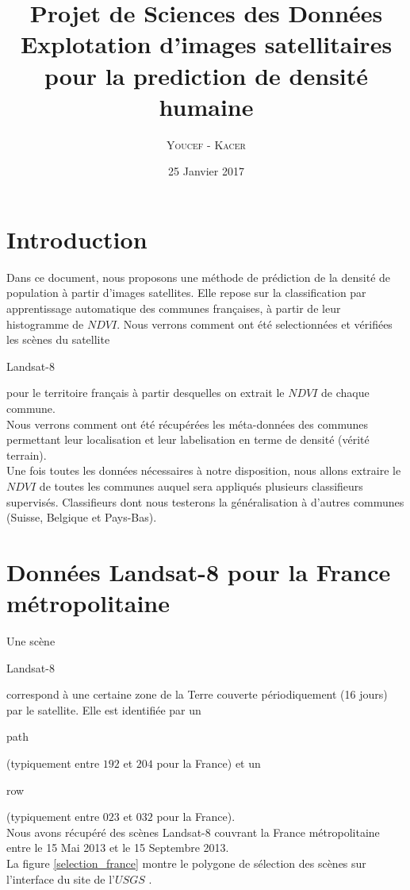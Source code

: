 \documentclass{book}
\title{%
  Projet de Sciences des Données \\
  \large Explotation d'images satellitaires \\pour la prediction de densité humaine\\
    }
\author{\textsc{Youcef} - \textsc{Kacer}}
\date{25 Janvier 2017}
\begin{document}
 
\maketitle

\tableofcontents

\frontmatter
\chapter{Introduction}
Dans ce document, nous proposons une méthode de prédiction de la densité de population à partir d'images satellites.
Elle repose sur la classification par apprentissage automatique des communes françaises, à partir de leur histogramme de $NDVI$. 
Nous verrons comment ont été selectionnées et vérifiées les scènes du satellite \begin{itshape}Landsat-8\end{itshape} pour le territoire français à partir desquelles on extrait le $NDVI$ de chaque commune.\\
Nous verrons comment ont été récupérées les méta-données des communes permettant leur localisation et leur labelisation en terme de densité (vérité terrain).\\
Une fois toutes les données nécessaires à notre disposition, nous allons extraire le $NDVI$ de toutes les communes auquel sera appliqués plusieurs classifieurs supervisés.
Classifieurs dont nous testerons la généralisation à d'autres communes (Suisse, Belgique et Pays-Bas).

\mainmatter
 
\chapter{Données Landsat-8 pour la France métropolitaine}

Une scène \begin{itshape}Landsat-8\end{itshape} correspond à une certaine zone de la Terre couverte périodiquement (16 jours) par le satellite. 
Elle est identifiée par un \begin{itshape}path\end{itshape} (typiquement entre
$192$ et $204$ pour la France) et un \begin{itshape}row\end{itshape} (typiquement entre $023$ et $032$ pour la France).\\ 
Nous avons récupéré des scènes Landsat-8 couvrant la France métropolitaine entre le 15 Mai 2013 et le 15 Septembre 2013.\\
La figure \ref{selection_france} montre le polygone de sélection des scènes sur l'interface du site de l'$USGS$ \cite{landsat8}.
\end{document}
